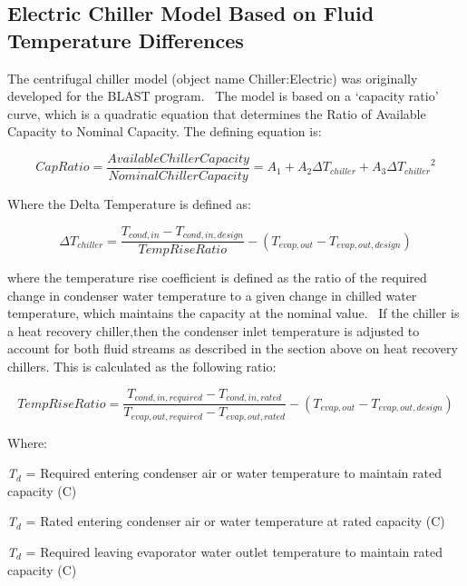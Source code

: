 \subsection{Electric Chiller Model Based on Fluid Temperature Differences}\label{electric-chiller-model-based-on-fluid-temperature-differences}

The centrifugal chiller model (object name Chiller:Electric) was originally developed for the BLAST program.~ The model is based on a `capacity ratio' curve, which is a quadratic equation that determines the Ratio of Available Capacity to Nominal Capacity. The defining equation is:

\begin{equation}
CapRatio = \frac{{Available Chiller Capacity}}{{Nominal Chiller Capacity}} = {A_1} + {A_2}\Delta {T_{chiller}} + {A_3}\Delta {T_{chiller}}^2
\end{equation}

Where the Delta Temperature is defined as:

\begin{equation}
\Delta {T_{chiller}} = \frac{{{T_{cond, in}} - {T_{cond,in,design}}}}{{TempRiseRatio}} - \left( {{T_{evap,out}} - {T_{evap,out,design}}} \right)
\end{equation}

where the temperature rise coefficient is defined as the ratio of the required change in condenser water temperature to a given change in chilled water temperature, which maintains the capacity at the nominal value.~ If the chiller is a heat recovery chiller,then the condenser inlet temperature is adjusted to account for both fluid streams as described in the section above on heat recovery chillers. This is calculated as the following ratio:

\begin{equation}
TempRiseRatio = \frac{{{T_{cond, in,required}} - {T_{cond,in,rated}}}}{{{T_{evap, out,required}} - {T_{evap,out,rated}}}} - \left( {{T_{evap,out}} - {T_{evap,out,design}}} \right)
\end{equation}

Where:

\emph{T\(_{d}\)} = Required entering condenser air or water temperature to maintain rated capacity (C)

\emph{T\(_{d}\)} = Rated entering condenser air or water temperature at rated capacity (C)

\emph{T\(_{d}\)} = Required leaving evaporator water outlet temperature to maintain rated capacity (C)

